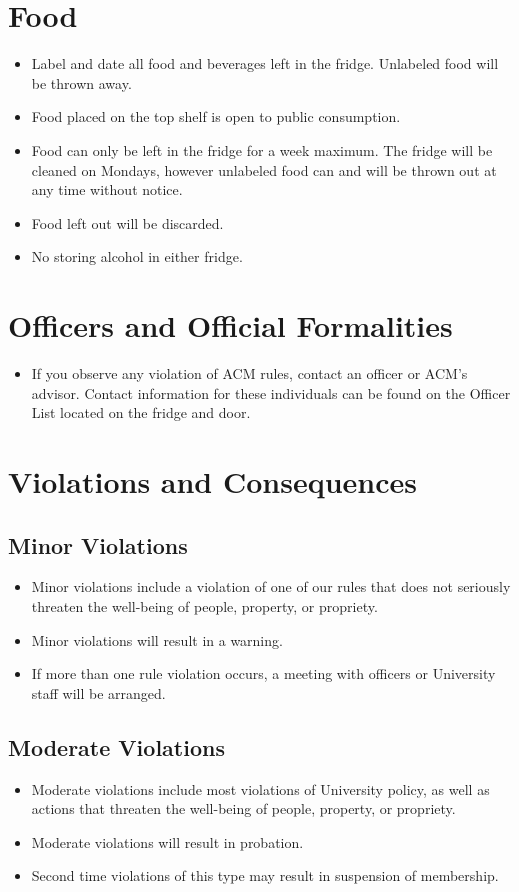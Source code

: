 \section{Food}
\begin{itemize}
	\item Label and date all food and beverages left in the fridge. Unlabeled food will be thrown away.
	\item Food placed on the top shelf is open to public consumption.
	\item Food can only be left in the fridge for a week maximum. The fridge will be cleaned on Mondays, however unlabeled food can and will be thrown out at any time without notice.
	\item Food left out will be discarded.
	\item No storing alcohol in either fridge.
\end{itemize}

\section{Officers and Official Formalities}
\begin{itemize}
	\item If you observe any violation of ACM rules, contact an officer or ACM's advisor. Contact information for these individuals can be found on the Officer List located on the fridge and door.
\end{itemize}

\section{Violations and Consequences}
\subsection{Minor Violations}
\begin{itemize}
	\item Minor violations include a violation of one of our rules that does not seriously threaten the well-being of people, property, or propriety.
	\item Minor violations will result in a warning.
	\item If more than one rule violation occurs, a meeting with officers or University staff will be arranged.
\end{itemize}

\subsection{Moderate Violations}
\begin{itemize}
	\item Moderate violations include most violations of University policy, as well as actions that threaten the well-being of people, property, or propriety.
	\item Moderate violations will result in probation.
	\item Second time violations of this type may result in suspension of membership.
\end{itemize}

